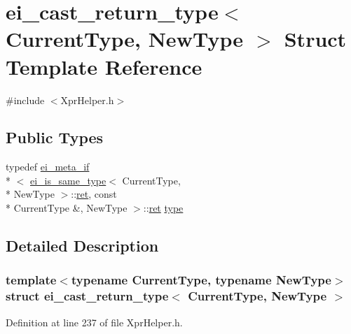 \hypertarget{structei__cast__return__type}{\section{ei\-\_\-cast\-\_\-return\-\_\-type$<$ Current\-Type, New\-Type $>$ Struct Template Reference}
\label{structei__cast__return__type}
}


{\ttfamily \#include $<$Xpr\-Helper.\-h$>$}

\subsection*{Public Types}
\begin{DoxyCompactItemize}
\item 
typedef \hyperlink{structei__meta__if}{ei\-\_\-meta\-\_\-if}\\*
$<$ \hyperlink{structei__is__same__type}{ei\-\_\-is\-\_\-same\-\_\-type}$<$ Current\-Type, \\*
New\-Type $>$\-::\hyperlink{group___i_p_conn_plugin_gabc99fe6afec1a75ccff1092e47375a40}{ret}, const \\*
Current\-Type \&, New\-Type $>$\-::\hyperlink{group___i_p_conn_plugin_gabc99fe6afec1a75ccff1092e47375a40}{ret} \hyperlink{structei__cast__return__type_aaf527fabe3ef319c8386e44538a6950e}{type}
\end{DoxyCompactItemize}


\subsection{Detailed Description}
\subsubsection*{template$<$typename Current\-Type, typename New\-Type$>$struct ei\-\_\-cast\-\_\-return\-\_\-type$<$ Current\-Type, New\-Type $>$}



Definition at line 237 of file Xpr\-Helper.\-h.



